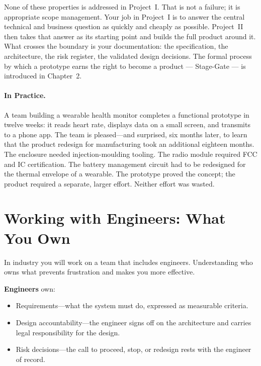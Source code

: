 None of these properties is addressed in Project~I.
That is not a failure; it is appropriate scope management.
Your job in Project~I is to answer the central technical and business
question as quickly and cheaply as possible.
Project~II then takes that answer as its starting point and builds the
full product around it.
What crosses the boundary is your documentation: the specification,
the architecture, the risk register, the validated design decisions.
The formal process by which a prototype earns the right to become a product --- Stage-Gate --- is introduced in Chapter~2.

\paragraph{In Practice.}
A team building a wearable health monitor completes a functional prototype
in twelve weeks: it reads heart rate, displays data on a small screen, and
transmits to a phone app.
The team is pleased---and surprised, six months later, to learn that the
product redesign for manufacturing took an additional eighteen months.
The enclosure needed injection-moulding tooling.
The radio module required FCC and IC certification.
The battery management circuit had to be redesigned for the thermal
envelope of a wearable.
The prototype proved the concept; the product required a separate,
larger effort.
Neither effort was wasted.

\section{Working with Engineers: What You Own}
\label{sec:ch1-working-with-engineers}

In industry you will work on a team that includes engineers.
Understanding who owns what prevents frustration and makes you more
effective.

\textbf{Engineers} own:
\begin{itemize}
  \item Requirements---what the system must do, expressed as measurable
        criteria.
  \item Design accountability---the engineer signs off on the architecture
        and carries legal responsibility for the design.
  \item Risk decisions---the call to proceed, stop, or redesign rests
        with the engineer of record.
\end{itemize}


